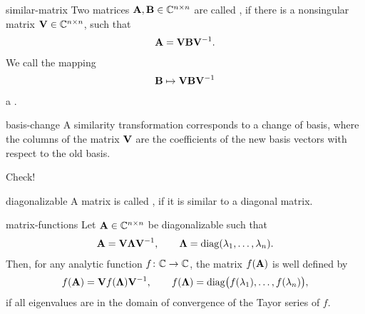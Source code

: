 \begin{Definition}{similar-matrix}
  Two matrices $\mathbf A,\mathbf B\in\mathbb C^{n\times n}$ are called , if there is a nonsingular matrix $\mathbf V\in\mathbb C^{n\times n}$, such that
  \begin{gather}
      \mathbf A = \mathbf V \mathbf B \mathbf V^{-1}.
  \end{gather}
  We call the mapping
  \begin{gather}
      \mathbf B \mapsto \mathbf V \mathbf B \mathbf V^{-1}
  \end{gather}
  a .
\end{Definition}

\begin{Lemma}{basis-change}
  A similarity transformation corresponds to a change of basis, where the columns of the matrix $\mathbf V$ are the coefficients of the new basis vectors with respect to the old basis.
  \begin{todo}
 Check!
  \end{todo}
\end{Lemma}

\begin{Definition}{diagonalizable}
  A matrix is called , if it is similar to a diagonal matrix.
\end{Definition}

\begin{Theorem}{matrix-functions}
  Let $\mathbf A\in \mathbb C^{n\times n}$ be diagonalizable such that
  \begin{gather}
    \mathbf A = \mathbf V \boldsymbol\Lambda \mathbf V^{-1},
    \qquad \boldsymbol\Lambda = \operatorname{diag}(\lambda_1,\dots,\lambda_n).
  \end{gather}
  Then, for any analytic function $f\colon \mathbb C \to \mathbb C$, the matrix
  $f(\mathbf A)$ is well defined by
  \begin{gather}
    f(\mathbf A) = \mathbf V f(\boldsymbol\Lambda) \mathbf V^{-1},
    \qquad f(\boldsymbol\Lambda) = \operatorname{diag}\bigl(f(\lambda_1),\dots,f(\lambda_n)\bigr),
  \end{gather}
  if all eigenvalues are in the domain of convergence of the Tayor
  series of $f$.
\end{Theorem}

